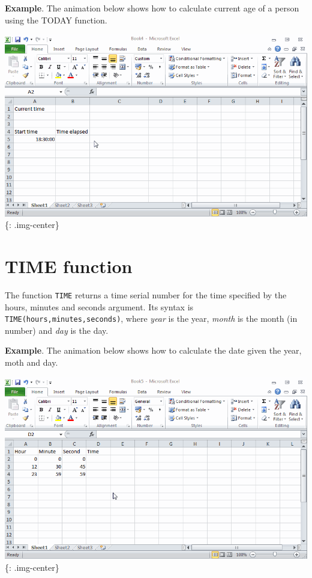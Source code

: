 \textbf{Example}. The animation below shows how to calculate current age of a person using the TODAY function.

\includegraphics[keepaspectratio,width=\textwidth,height=0.75\textheight]{img/example_function_now.gif}
\{: .img-center\}

\section{TIME function}
\label{timefunction}

The function \texttt{TIME} returns a time serial number for the time specified by the hours, minutes and seconds argument. Its syntax is \texttt{TIME(hours,minutes,seconds)}, where \emph{year} is the year, \emph{month} is the month (in number) and \emph{day} is the day.

\textbf{Example}. The animation below shows how to calculate the date given the year, moth and day.

\includegraphics[keepaspectratio,width=\textwidth,height=0.75\textheight]{img/example_function_time.gif}
\{: .img-center\}

